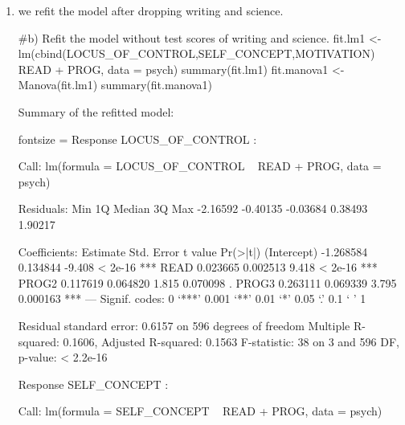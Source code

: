 \documentclass{article}
\begin{document}
\begin{enumerate}[leftmargin = 0 em, label = \arabic*., font = \bfseries]
\begin{enumerate}
\begin{rcode*}{fontsize = \footnotesize}
------------------------------------------
 
Term: PROG 

Sum of squares and products for the hypothesis:
                 LOCUS_OF_CONTROL SELF_CONCEPT MOTIVATION
LOCUS_OF_CONTROL         5.029620     8.290863   12.25844
SELF_CONCEPT             8.290863    14.218385   20.61640
MOTIVATION              12.258441    20.616397   30.18084

Multivariate Tests: PROG
                 Df test stat approx F num Df den Df     Pr(>F)    
Pillai            2 0.1086487 11.35496      6   1186 2.2795e-12 ***
Wilks             2 0.8914383 11.67076      6   1184 9.8057e-13 ***
Hotelling-Lawley  2 0.1216850 11.98597      6   1182 4.2255e-13 ***
Roy               2 0.1208775 23.89346      3    593 1.3102e-14 ***
---
Signif. codes:  0 ‘***’ 0.001 ‘**’ 0.01 ‘*’ 0.05 ‘.’ 0.1 ‘ ’ 1
	\end{rcode*}


	\item 
	we refit the model after dropping writing and science.
	\begin{rcode}
#b) Refit the model without test scores of writing and science.
fit.lm1 <- lm(cbind(LOCUS_OF_CONTROL,SELF_CONCEPT,MOTIVATION)~ READ + PROG, data = psych)
summary(fit.lm1)
fit.manova1 <- Manova(fit.lm1)
summary(fit.manova1)
	\end{rcode}

Summary of the refitted model:
\begin{rcode*}{fontsize = \footnotesize}
Response LOCUS_OF_CONTROL :

Call:
lm(formula = LOCUS_OF_CONTROL ~ READ + PROG, data = psych)

Residuals:
     Min       1Q   Median       3Q      Max 
-2.16592 -0.40135 -0.03684  0.38493  1.90217 

Coefficients:
             Estimate Std. Error t value Pr(>|t|)    
(Intercept) -1.268584   0.134844  -9.408  < 2e-16 ***
READ         0.023665   0.002513   9.418  < 2e-16 ***
PROG2        0.117619   0.064820   1.815 0.070098 .  
PROG3        0.263111   0.069339   3.795 0.000163 ***
---
Signif. codes:  0 ‘***’ 0.001 ‘**’ 0.01 ‘*’ 0.05 ‘.’ 0.1 ‘ ’ 1

Residual standard error: 0.6157 on 596 degrees of freedom
Multiple R-squared:  0.1606,	Adjusted R-squared:  0.1563 
F-statistic:    38 on 3 and 596 DF,  p-value: < 2.2e-16


Response SELF_CONCEPT :

Call:
lm(formula = SELF_CONCEPT ~ READ + PROG, data = psych)


\end{rcode*}
\end{enumerate}
\end{enumerate}
\end{document}
